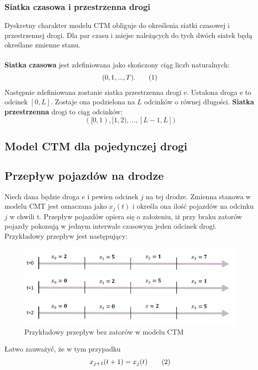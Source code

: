 \documentclass[12pt]{book}
\theoremstyle{plain}
\newcommand\addtag{\refstepcounter{equation}
\renewcommand{\labelenumii}{\theenumii}
\renewcommand{\theenumii}{\theenumi.\arabic{enumii}.}
\tag{\theequation}}
\begin{document}
\subsubsection*{Siatka czasowa i przestrzenna drogi}
Dyskretny charakter modelu CTM obliguje do określenia siatki czasowej i przestrzennej drogi. Dla par czasu i miejsc należących do tych dwóch siatek będą określane zmienne stanu. \\ \\ \textbf{Siatka czasowa} jest zdefiniowana jako skończony ciąg liczb naturalnych:
\[(0,1,...,T). \addtag \]
Następnie zdefiniowana zostanie siatka przestrzenna drogi e. Ustalona droga e to odcinek $[0,L]$. Zostaje ona podzielona na $L$ odcinków o równej długości. \textbf{Siatka przestrzenna} drogi to ciąg odcinków:
\[([0,1),[1,2),...,[L-1,L] )\]

\subsection{Model CTM dla pojedynczej drogi}
\subsection*{Przepływ pojazdów na drodze}
Niech dana będzie droga $e$ i pewien odcinek $j$ na tej drodze. Zmienna stanowa w modelu CMT jest oznaczana jako $x_j(t)$ i określa ona ilość pojazdów na odcinku $j$ w chwili t.
Przepływ pojazdów opiera się o założeniu, iż przy braku zatorów pojazdy pokonują w jednym interwale czasowym jeden odcinek drogi. Przykładowy przepływ jest następujący:
\begin{figure}[H]
	\centering
	\includegraphics[width=14cm]{images/CTM_flow_example}
	\caption{Przykładowy przepływ bez zatorów w modelu CTM}
	\label{fig:CTM_flow_example}
\end{figure} \noindent
Łatwo zauważyć, że w tym przypadku
\[ x_{j+1}(t+1)=x_j(t) \addtag \]
\end{document}
